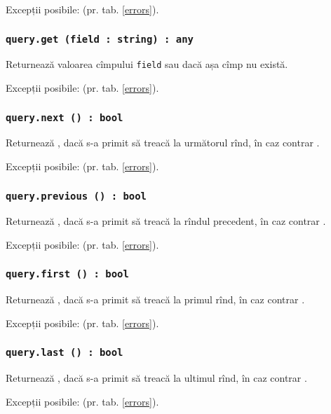 Excepții posibile:  (pr. tab. \ref{errors}).

\subsubsection{\texttt{query.get (field : string) : any}}

Returnează valoarea cîmpului \texttt{field} sau \void{} dacă așa cîmp nu există.

Excepții posibile:  (pr. tab. \ref{errors}).

\subsubsection{\texttt{query.next () : bool}}

Returnează \true, dacă s-a primit să treacă la următorul rînd, în caz contrar \false.

Excepții posibile:  (pr. tab. \ref{errors}).

\subsubsection{\texttt{query.previous () : bool}}

Returnează \true, dacă s-a primit să treacă la rîndul precedent, în caz contrar \false.

Excepții posibile:  (pr. tab. \ref{errors}).

\subsubsection{\texttt{query.first () : bool}}

Returnează \true, dacă s-a primit să treacă la primul rînd, în caz contrar \false.

Excepții posibile:  (pr. tab. \ref{errors}).

\subsubsection{\texttt{query.last () : bool}}

Returnează \true, dacă s-a primit să treacă la ultimul rînd, în caz contrar \false.

Excepții posibile:  (pr. tab. \ref{errors}).


